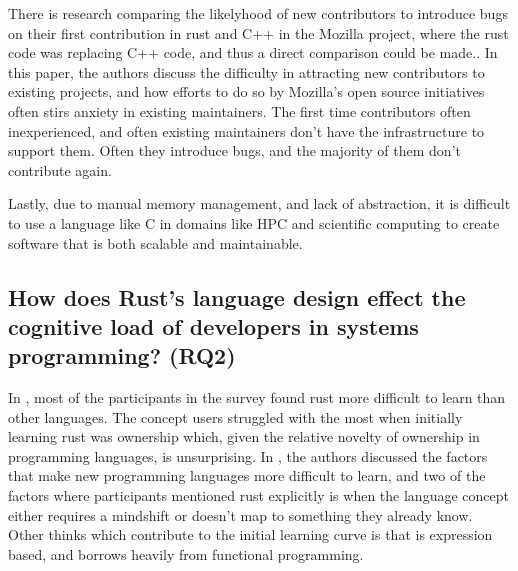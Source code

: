 \documentclass[conference]{IEEEtran}
\begin{document}
{
    There is research comparing the likelyhood of new contributors to introduce bugs on their first contribution in rust and C++
    in the Mozilla project, where the rust code was replacing C++ code, and thus a direct comparison could be made.\cite{traceyGradingCurveHow2023}. In this paper, the authors discuss the difficulty in attracting new contributors to existing projects, and how efforts to do so by Mozilla's open source initiatives often stirs anxiety in existing maintainers. The first time contributors often inexperienced, and often existing maintainers don't have the infrastructure to support them. Often they introduce bugs, and the majority of them don't contribute again.
}

{
    Lastly, due to manual memory management, and lack of abstraction, it is difficult to use a language like C in domains like HPC and scientific computing to create software that is both scalable and maintainable\cite{costanzoPerformanceVsProgramming2021}.
}

\subsection{How does Rust's language design effect the cognitive load of developers in systems programming? (RQ2)}
{
    In \cite{fultonBenefitsDrawbacksAdopting2021}, most of the
    participants in the survey found rust more difficult to learn than other languages. The concept users
    struggled with the most when initially learning rust was ownership which, given the relative novelty of ownership
    in programming languages, is unsurprising. In \cite{shresthaHereWeGo2020}, the authors discussed the factors that make new programming languages more difficult to learn, and two of the factors where participants mentioned rust explicitly is when the language concept either requires a mindshift or doesn't map to something they already know. Other thinks which contribute to the initial learning curve is that is expression based, and borrows heavily from functional programming.
}
\end{document}

